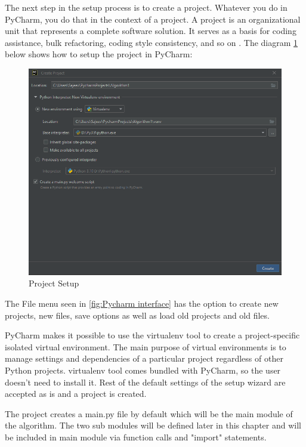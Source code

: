 The next step in the setup process is to create a project. Whatever you do in PyCharm, you do that in the context of a project. A project is an organizational unit that represents a complete software solution. It serves as a basis for coding assistance, bulk refactoring, coding style consistency, and so on \cite{PyCharm}. The diagram \ref{fig:Project Setup} below shows how to setup the project in PyCharm: 


\begin{figure}[h]
    \centering
    \includegraphics[width= \textwidth]{images/SetupProject.png}
    \caption [Project Setup]{Project Setup}  
    \label{fig:Project Setup}
\end{figure}



The File menu seen in \ref{fig:Pycharm interface} has the option to create new projects, new files, save options as well as load old projects and old files.

PyCharm makes it possible to use the virtualenv tool to create a project-specific isolated virtual environment. The main purpose of virtual environments is to manage settings and dependencies of a particular project regardless of other Python projects. virtualenv tool comes bundled with PyCharm, so the user doesn't need to install it. Rest of the default settings of the setup wizard are accepted as is and a project is created. 

The project creates a main.py file by default which will be the main module of the algorithm. The two sub modules will be defined later in this chapter and will be included in main module via function calls and "import" statements.

